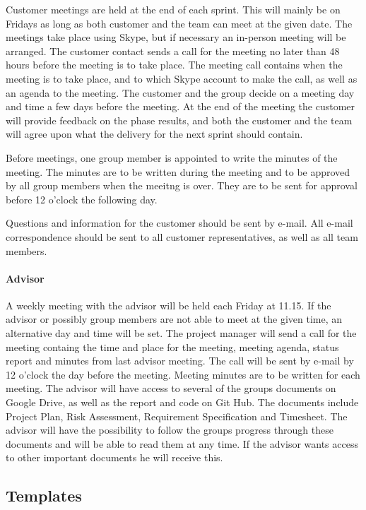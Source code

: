 Customer meetings are held at the end of each sprint. This will mainly be on Fridays as long as both customer and the team can meet at the given date. The meetings take place using Skype, but if necessary an in-person meeting will be arranged. The customer contact sends a call for the meeting no later than 48 hours before the meeting is to take place. The meeting call contains when the meeting is to take place, and to which Skype account to make the call, as well as an agenda to the meeting. The customer and the group decide on a meeting day and time a few days before the meeting. At the end of the meeting the customer will provide feedback on the phase results, and both the customer and the team will agree upon what the delivery for the next sprint should contain.

Before meetings, one group member is appointed to write the minutes of the meeting. The minutes are to be written during the meeting and to be approved by all group members when the meeitng is over. They are to be sent for approval before 12 o'clock the following day. 

Questions and information for the customer should be sent by e-mail. All e-mail correspondence should be sent to all customer representatives, as well as all team members.

\paragraph{Advisor}

A weekly meeting with the advisor will be held each Friday at 11.15. If the advisor or possibly group members are not able to meet at the given time, an alternative day and time will be set. The project manager will send a call for the meeting containg the time and place for the meeting, meeting agenda, status report and minutes from last advisor meeting. The call will be sent by e-mail by 12 o'clock the day before the meeting. Meeting minutes are to be written for each meeting. The advisor will have access to several of the groups documents on Google Drive, as well as the report and code on Git Hub. The documents include Project Plan, Risk Assessment, Requirement Specification and Timesheet. The advisor will have the possibility to follow the groups progress through these documents and will be able to read them at any time. If the advisor wants access to other important documents he will receive this. 

\subsection{Templates}

